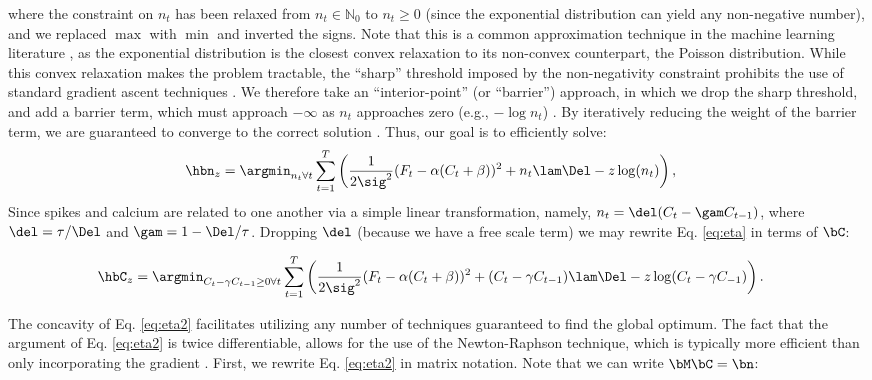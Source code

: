 \noindent where the constraint on $n_t$ has been relaxed from  $n_t \in \mathbb{N}_0$ to $n_t \geq 0$ (since the exponential distribution can yield any non-negative number), and we replaced $\max$ with $\min$ and inverted the signs.  Note that this is a common approximation technique in the machine learning literature \cite{TBF01}, as the exponential distribution is the closest convex relaxation to its non-convex counterpart, the Poisson distribution. While this convex relaxation makes the problem tractable, the ``sharp'' threshold imposed by the non-negativity constraint prohibits the use of standard gradient ascent techniques \cite{CONV04}. We therefore take an ``interior-point'' (or ``barrier'') approach, in which we drop the sharp threshold, and add a barrier term, which must approach $-\infty$ as $n_t$ approaches zero (e.g., $-\log n_t$) \cite{CONV04}.  By iteratively reducing the weight of the barrier term, we are guaranteed to converge to the correct solution \cite{CONV04}.  Thus, our goal is to efficiently solve:
\begin{align} \label{eq:eta}
\hbn_{\zzz} &= \argmin_{n_t \forall t}  \sum_{t=1}^T \left( \frac{1}{2 \sig^2}(F_t - \alpha(C_t + \beta))^2  +  n_t  \lam \Del - \zzz \log(n_t) \right),
\end{align}
Since spikes and calcium are related to one another via a simple linear transformation, namely, $n_t= \del (C_t-\gam C_{t-1})$, where $\del=\tau/\Del$ and $\gam=1-\Del/\tau$.  Dropping $\del$ (because we have a free scale term) we may rewrite Eq. \eqref{eq:eta} in terms of $\bC$:

\begin{align} 
\hbC_{\zzz} &= \argmin_{C_t - \gamma C_{t-1} \geq 0 \forall t} \sum_{t=1}^{T} \left( \frac{1}{2 \sig^2} (F_t -\alpha (C_t + \beta))^2  + (C_t - \gamma C_{t-1}) \lam \Del - \zzz \log(C_t - \gamma C_{-1}) \right). \label{eq:eta2}
\end{align}

\noindent The concavity of Eq. \eqref{eq:eta2} facilitates utilizing any number of techniques guaranteed to find the global optimum.  The fact that the argument of Eq. \eqref{eq:eta2} is twice differentiable, allows for the use of the Newton-Raphson technique, which is typically more efficient than only incorporating the gradient \cite{CONV04}. First, we rewrite Eq. \eqref{eq:eta2} in matrix notation.  Note that we can write $\bM \bC = \bn$:

